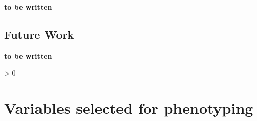 \documentclass[
  oneside]{book}
\newlength{\cslhangindent}
\newenvironment{CSLReferences}[2] %
 {%
  \setlength{\parindent}{0pt}
  \ifodd #1 \everypar{\setlength{\hangindent}{\cslhangindent}}\ignorespaces\fi
  \ifnum #2 > 0
  \setlength{\parskip}{#2\baselineskip}
  \fi
 }%
 {}
\begin{document}
\textbf{to be written}

\hypertarget{summary-future-work}{%
\section{Future Work}\label{summary-future-work}}

\textbf{to be written}

\hypertarget{appendix-appendix}{%
\appendix}


\hypertarget{refs}{}
\begin{CSLReferences}{0}{0}
\end{CSLReferences}

\hypertarget{appx-pheno}{%
\chapter{Variables selected for phenotyping}\label{appx-pheno}}
\end{document}
